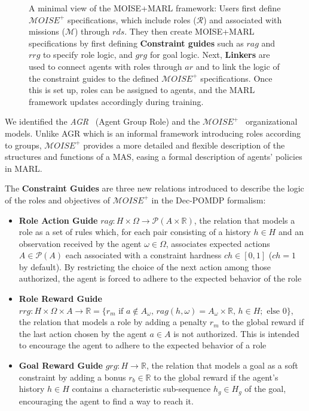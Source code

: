 \documentclass[sigconf,anonymous]{aamas}
\begin{document}
\begin{figure}[h!]
    \centering
    
    \caption{A minimal view of the MOISE+MARL framework: 
    Users first define $\mathcal{M}OISE^+$ specifications, which include roles ($\mathcal{R}$) and associated with missions ($\mathcal{M}$) through $rds$. They then create MOISE+MARL specifications by first defining \textbf{Constraint guides} such as $rag$ and $rrg$ to specify role logic, and $grg$ for goal logic. 
    Next, \textbf{Linkers} are used to connect agents with roles through $ar$ and to link the logic of the constraint guides to the defined $\mathcal{M}OISE^+$ specifications. Once this is set up, roles can be assigned to agents, and the MARL framework updates accordingly during training.
    }
    \label{fig:mm_synthesis}
\end{figure}

We identified the \textit{AGR}~\cite{ferber2003} (Agent Group Role) and the $\mathcal{M}OISE^+$~\citep{Hubner2007} organizational models. Unlike AGR which is an informal framework introducing roles according to groups, $\mathcal{M}OISE^+$ provides a more detailed and flexible description of the structures and functions of a MAS, easing a formal description of agents' policies in MARL.

\noindent The \textbf{Constraint Guides} are three new relations introduced to describe the logic of the roles and objectives of $\mathcal{M}OISE^+$ in the Dec-POMDP formalism:
%
\begin{itemize}
    \item \textbf{Role Action Guide} \quad $rag: H \times \Omega \rightarrow \mathcal{P}(A \times \mathbb{R})$, the relation that models a role as a set of rules which, for each pair consisting of a history $h \in H$ and an observation received by the agent $\omega \in \Omega$, associates expected actions $A \in \mathcal{P}(A)$ each associated with a constraint hardness $ch \in [0,1]$ ($ch = 1$ by default). By restricting the choice of the next action among those authorized, the agent is forced to adhere to the expected behavior of the role
    \item \textbf{Role Reward Guide} \quad $rrg: H \times \Omega \times A \to \mathbb{R} = \{r_m \text{ if } a \notin A_\omega \text{, } rag(h, \omega) = A_\omega \times \mathbb{R} \text{, } h \in H; \text{ else } 0\}$, the relation that models a role by adding a penalty $r_m$ to the global reward if the last action chosen by the agent $a \in A$ is not authorized. This is intended to encourage the agent to adhere to the expected behavior of a role
    \item \textbf{Goal Reward Guide} \quad $grg: H \rightarrow \mathbb{R}$, the relation that models a goal as a soft constraint by adding a bonus $r_b \in \mathbb{R}$ to the global reward if the agent's history $h \in H$ contains a characteristic sub-sequence $h_g \in H_g$ of the goal, encouraging the agent to find a way to reach it.
\end{itemize}
\end{document}
